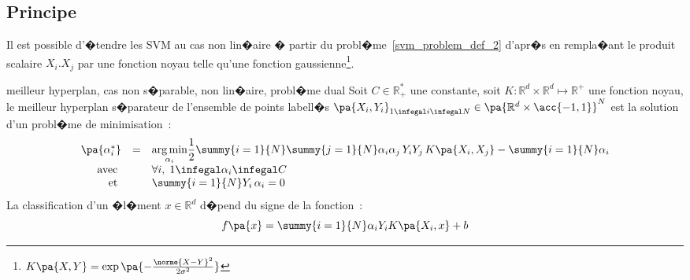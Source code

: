 \subsection{Principe}

Il est possible d'�tendre les SVM au cas non lin�aire � partir du probl�me~\ref{svm_problem_def_2} d'apr�s  en rempla�ant le produit scalaire $X_i . X_j$ par une fonction noyau telle qu'une fonction gaussienne\footnote{$K\pa{X,Y} = \exp\pa{ - \frac{ \norme{ X - Y }^2 }{2 \sigma^2}}$}.


            \begin{xproblem}{meilleur hyperplan, cas non s�parable, non lin�aire, probl�me dual}\label{svm_problem_def_3}
            Soit $C \in \mathbb{R}^*_+$ une constante, soit $K : \mathbb{R}^d \times \mathbb{R}^d \longmapsto \mathbb{R}^+$ une fonction noyau,
            le meilleur hyperplan s�parateur de l'ensemble de points labell�s
            $\pa{X_i,Y_i}_{1 \infegal i \infegal N} \in \pa{ \mathbb{R}^d \times \acc{-1,1} }^N$ est la solution
            d'un probl�me de minimisation~: 
                    $$
                    \begin{array}{rcl}    \pa{\alpha_i^*} &=& \underset{\alpha_i}{\arg \min} \dfrac{1}{2}  
                                                                                    \summy{i=1}{N}\summy{j=1}{N}
                                                                                            \alpha_i \alpha_j \,
                                                                                            Y_i Y_j \,
                                                                                            K\pa{X_i,X_j}
                                                                                    - \summy{i=1}{N} \alpha_i \\
                                         \text{avec }      && \forall i, \; 1 \infegal \alpha_i \infegal C \\
                                         \text{et }          && \summy{i=1}{N} Y_i \, \alpha_i = 0
                    \end{array}                                        
                    $$
            La classification d'un �l�ment $x \in \mathbb{R}^d$ d�pend du signe de la fonction~:
                    $$
                    f\pa{x} = \summy{i=1}{N} \alpha_i Y_i K\pa{X_i,x} + b
                    $$
            \end{xproblem}


